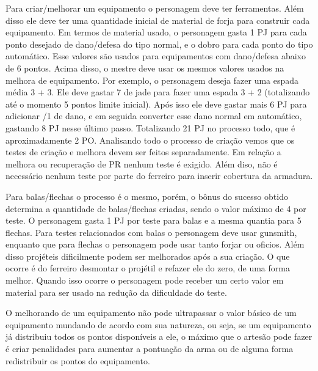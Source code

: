 Para criar/melhorar um equipamento o personagem deve ter ferramentas. Além disso ele deve ter uma quantidade inicial de material de forja para construir cada equipamento. Em termos de material usado, o personagem gasta 1 PJ para cada ponto desejado de dano/defesa do tipo normal, e o dobro para cada ponto do tipo automático. Esse valores são usados para equipamentos com dano/defesa abaixo de 6 pontos. Acima disso, o mestre deve usar os mesmos valores usados na melhora de equipamento. Por exemplo, o personagem deseja fazer uma espada  média 3 + 3. Ele deve gastar 7 de jade para fazer uma espada 3 + 2 (totalizando até o momento 5 pontos limite inicial). Após isso ele deve gastar  mais 6 PJ para adicionar /1 de dano, e em seguida converter esse dano normal em automático, gastando 8 PJ nesse último passo. Totalizando 21 PJ no processo todo, que é aproximadamente 2 PO. Analisando todo o processo de criação vemos que os testes de criação e melhora devem ser feitos separadamente. Em relação a melhora ou recuperação de PR nenhum teste é exigido. Além diso, não é necessário nenhum teste por parte do ferreiro para inserir cobertura da armadura.


Para balas/flechas o processo é o mesmo, porém, o bônus do sucesso obtido determina a quantidade de balas/flechas criadas, sendo o valor máximo de 4 por teste. O personagem gasta 1 PJ por teste para balas e a mesma quantia para 5 flechas. Para testes relacionados com balas o personagem deve usar gunsmith, enquanto que para flechas o personagem pode usar tanto forjar ou oficios. Além disso projéteis dificilmente podem ser melhorados após a sua criação. O que ocorre é do ferreiro desmontar o projétil e refazer ele do zero, de uma forma melhor. Quando isso ocorre o personagem pode receber um certo valor em material para ser usado na redução da dificuldade do teste.



O melhorando de um equipamento não pode ultrapassar o valor básico de um equipamento mundando de acordo com sua natureza, ou seja, se um equipamento já distribuiu todos os pontos disponíveis a ele, o máximo que o artesão pode fazer é criar penalidades para aumentar a pontuação da arma ou de alguma forma redistribuir os pontos do equipamento.


